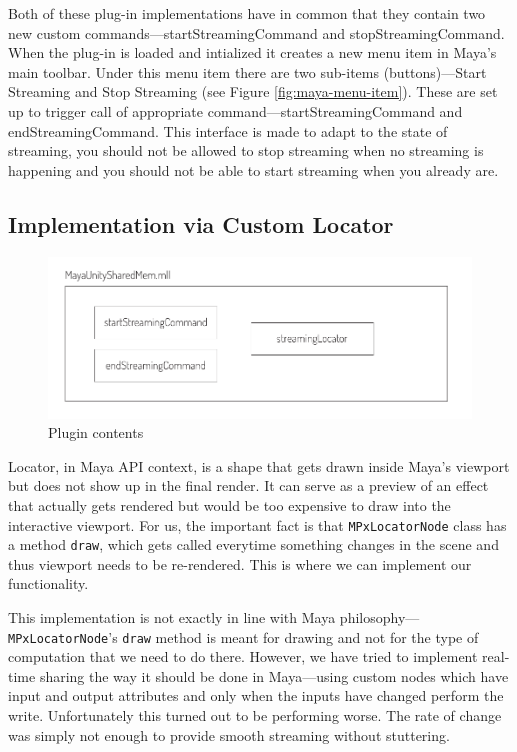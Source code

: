 \documentclass[
  digital, %
  table,   %
  nolof,     %
  nolot,     %
  oneside,
]{fithesis3}
\begin{document}
Both of these plug-in implementations have in common that they contain two new custom commands—startStreamingCommand and stopStreamingCommand. When the plug-in is loaded and intialized it creates a new menu item in Maya's main toolbar. Under this menu item there are two sub-items (buttons)—Start Streaming and Stop Streaming (see Figure \ref{fig:maya-menu-item}). These are set up to trigger call of appropriate command—startStreamingCommand and endStreamingCommand. This interface is made to adapt to the state of streaming, you should not be allowed to stop streaming when no streaming is happening and you should not be able to start streaming when you already are.

\subsection{Implementation via Custom Locator}
\begin{figure}
  \centering
  \includegraphics[scale=0.8]{images/plugin-contents.pdf}
  \caption{Plugin contents}
  \label{fig:plugin-content}
\end{figure}
Locator, in Maya API context, is a shape that gets drawn inside Maya's viewport but does not show up in the final render. It can serve as a preview of an effect that actually gets rendered but would be too expensive to draw into the interactive viewport. For us, the important fact is that \texttt{MPxLocatorNode} class has a method \texttt{draw}, which gets called everytime something changes in the scene and thus viewport needs to be re-rendered. This is where we can implement our functionality.

This implementation is not exactly in line with Maya philosophy—\texttt{MPxLocatorNode}'s \texttt{draw} method is meant for drawing and not for the type of computation that we need to do there. However, we have tried to implement real-time sharing the way it should be done in Maya—using custom nodes which have input and output attributes and only when the inputs have changed perform the write. Unfortunately this turned out to be performing worse. The rate of change was simply not enough to provide smooth streaming without stuttering.
\end{document}
